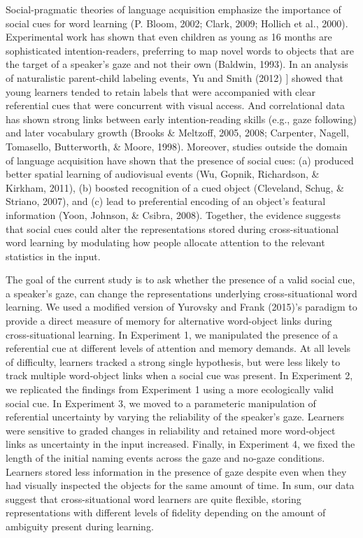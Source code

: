 \documentclass[authoryear, review]{elsarticle}
\begin{document}
Social-pragmatic theories of language acquisition emphasize the
importance of social cues for word learning (P. Bloom, 2002; Clark,
2009; Hollich et al., 2000). Experimental work has shown that even
children as young as 16 months are sophisticated intention-readers,
preferring to map novel words to objects that are the target of a
speaker's gaze and not their own (Baldwin, 1993). In an analysis of
naturalistic parent-child labeling events, Yu and Smith (2012) {]}
showed that young learners tended to retain labels that were accompanied
with clear referential cues that were concurrent with visual access. And
correlational data has shown strong links between early
intention-reading skills (e.g., gaze following) and later vocabulary
growth (Brooks \& Meltzoff, 2005, 2008; Carpenter, Nagell, Tomasello,
Butterworth, \& Moore, 1998). Moreover, studies outside the domain of
language acquisition have shown that the presence of social cues: (a)
produced better spatial learning of audiovisual events (Wu, Gopnik,
Richardson, \& Kirkham, 2011), (b) boosted recognition of a cued object
(Cleveland, Schug, \& Striano, 2007), and (c) lead to preferential
encoding of an object's featural information (Yoon, Johnson, \& Csibra,
2008). Together, the evidence suggests that social cues could alter the
representations stored during cross-situational word learning by
modulating how people allocate attention to the relevant statistics in
the input.

The goal of the current study is to ask whether the presence of a valid
social cue, a speaker's gaze, can change the representations underlying
cross-situational word learning. We used a modified version of Yurovsky
and Frank (2015)'s paradigm to provide a direct measure of memory for
alternative word-object links during cross-situational learning. In
Experiment 1, we manipulated the presence of a referential cue at
different levels of attention and memory demands. At all levels of
difficulty, learners tracked a strong single hypothesis, but were less
likely to track multiple word-object links when a social cue was
present. In Experiment 2, we replicated the findings from Experiment 1
using a more ecologically valid social cue. In Experiment 3, we moved to
a parameteric manipulation of referential uncertainty by varying the
reliability of the speaker's gaze. Learners were sensitive to graded
changes in reliability and retained more word-object links as
uncertainty in the input increased. Finally, in Experiment 4, we fixed
the length of the initial naming events across the gaze and no-gaze
conditions. Learners stored less information in the presence of gaze
despite even when they had visually inspected the objects for the same
amount of time. In sum, our data suggest that cross-situational word
learners are quite flexible, storing representations with different
levels of fidelity depending on the amount of ambiguity present during
learning.
\end{document}
